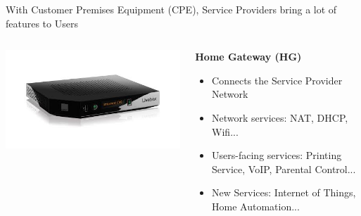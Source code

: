 \documentclass[a4paper]{beamer}
\begin{document}
\begin{frame}{With Customer Premises Equipment (CPE), Service Providers bring a lot of features to Users}
												
											
	\begin{columns}[T] 
		\begin{column}[T]{0.25 \textwidth} 
			\includegraphics[width=\linewidth]{livebox.png}
		\end{column}
																										
		\begin{column}[T]{0.75 \textwidth} %
																																							
			\textbf{Home Gateway  (HG)}
			\begin{itemize}
				\item Connects the Service Provider Network 
				\item Network services: NAT, DHCP, Wifi...
				\item Users-facing services: Printing Service, VoIP, Parental Control...
				\item New Services: Internet of Things, Home Automation...
			\end{itemize}
			\vspace{1em}
																																							
		\end{column}
																										
	\end{columns}
												
												
													

\end{frame}
\end{document}
